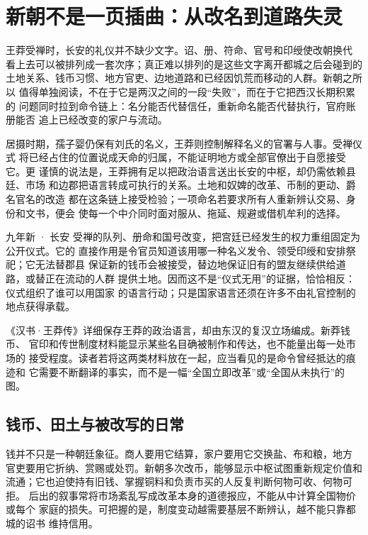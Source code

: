 \section{新朝不是一页插曲：从改名到道路失灵}
\label{sec:han-xin-depth}

王莽受禅时，长安的礼仪并不缺少文字。诏、册、符命、官号和印绶使改朝换代
看上去可以被排列成一套次序；真正难以排列的是这些文字离开都城之后会碰到的
土地关系、钱币习惯、地方官吏、边地道路和已经因饥荒而移动的人群。新朝之所以
值得单独阅读，不在于它是两汉之间的一段“失败”，而在于它把西汉长期积累的
问题同时拉到命令链上：名分能否代替信任，重新命名能否代替执行，官府账册能否
追上已经改变的家户与流动。

居摄时期，孺子婴仍保有刘氏的名义，王莽则控制解释名义的官署与人事。受禅仪式
将已经占住的位置说成天命的归属，不能证明地方或全部官僚出于自愿接受它。更
谨慎的说法是，王莽拥有足以把政治语言送出长安的中枢，却仍需依赖县廷、市场
和边郡把语言转成可执行的关系。土地和奴婢的改革、币制的更动、爵名官名的改造
都在这条链上接受检验；一项命名若要求所有人重新辨认交易、身份和文书，便会
使每一个中介同时面对服从、拖延、规避或借机牟利的选择。

\begin{event}{}{九年}{新 · 长安}{}
受禅的队列、册命和国号改变，把宫廷已经发生的权力重组固定为公开仪式。它的
直接作用是令官员知道该用哪一种名义发令、领受印绶和安排祭祀；它无法替郡县
保证新的钱币会被接受，替边地保证旧有的盟友继续供给道路，或替正在流动的人群
提供土地。因而这不是“仪式无用”的证据，恰恰相反：仪式组织了谁可以用国家
的语言行动；只是国家语言还须在许多不由礼官控制的地点获得承载。

《汉书·王莽传》详细保存王莽的政治语言，却由东汉的复汉立场编成。新莽钱币、
官印和传世制度材料能显示某些名目确被制作和传达，也不能量出每一处市场的
接受程度。读者若将这两类材料放在一起，应当看见的是命令曾经抵达的痕迹和
它需要不断翻译的事实，而不是一幅“全国立即改革”或“全国从未执行”的图。
\end{event}

\subsection{钱币、田土与被改写的日常}

钱并不只是一种朝廷象征。商人要用它结算，家户要用它交换盐、布和粮，地方
官吏要用它折纳、赏赐或处罚。新朝多次改币，能够显示中枢试图重新规定价值和
流通；它也迫使持有旧钱、掌握铜料和负责市买的人反复判断何物可收、何物可拒。
后出的叙事常将市场紊乱写成改革本身的道德报应，不能从中计算全国物价或每个
家庭的损失。可把握的是，制度变动越需要基层不断辨认，越不能只靠都城的诏书
维持信用。

